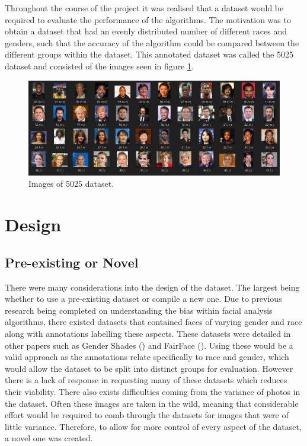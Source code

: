 \documentclass{l4proj}
\begin{document}
Throughout the course of the project it was realised that a dataset would be required to evaluate the performance of the algorithms. The motivation was to obtain a dataset that had an evenly distributed number of different races and genders, such that the accuracy of the algorithm could be compared between the different groups within the dataset. This annotated dataset was called the 5025 dataset and consisted of the images seen in figure \ref{5025}.
\begin{figure}[h!]
  \centering
  \begin{minipage}{\textwidth}
    \includegraphics[width=\textwidth]{images/dataset.PNG}
    \caption{Images of 5025 dataset.}
    \label{5025}
  \end{minipage}
  \hfill
\end{figure}
\section{Design}
\label{datasetdesign}

\subsection{Pre-existing or Novel}
There were many considerations into the design of the dataset. The largest being whether to use a pre-existing dataset or compile a new one. Due to previous research being completed on understanding the bias within facial analysis algorithms, there existed datasets that contained faces of varying gender and race along with annotations labelling these aspects. These datasets were detailed in other papers such as Gender Shades (\cite{gendershades}) and FairFace (\cite{fairface}). Using these would be a valid approach as the annotations relate specifically to race and gender, which would allow the dataset to be split into distinct groups for evaluation. However there is a lack of response in requesting many of these datasets which reduces their viability. There also exists difficulties coming from the variance of photos in the dataset. Often these images are taken in the wild, meaning that considerable effort would be required to comb through the datasets for images that were of little variance. Therefore, to allow for more control of every aspect of the dataset, a novel one was created.
\end{document}
